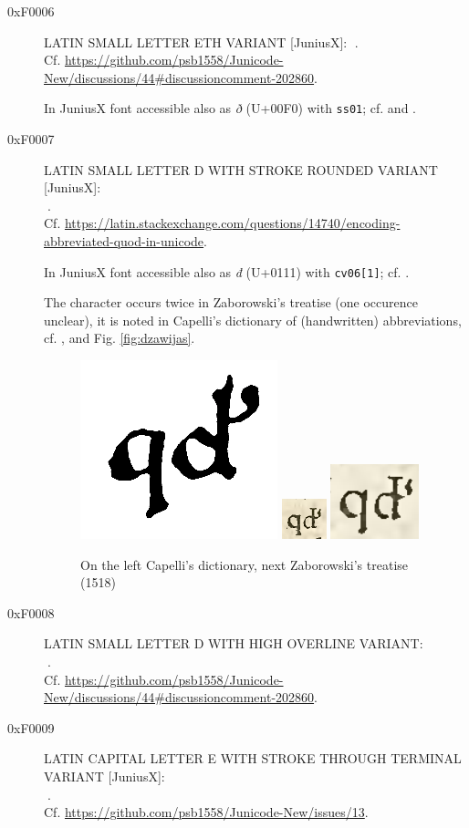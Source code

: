 \documentclass{article}
\newcommand{\Jglyph}[1]{{\relsize{2}\J#1}}
\begin{document}
\begin{description}
\item [0xF0006] LATIN SMALL LETTER ETH VARIANT [JuniusX]: 
  \Jglyph{󰀆}.\\ Cf. \url{https://github.com/psb1558/Junicode-New/discussions/44#discussioncomment-202860}.

  In JuniusX font accessible also as \textit{ð} (U+00F0) with
  \texttt{ss01};
  cf. \autocite[p. 11]{baker20:_opent_featur_junius_junius} and
  \autocite[p. 4 (30)]{kenmcd20:_junius_user_guide_first_draft}.

\item [0xF0007] LATIN SMALL LETTER D WITH STROKE ROUNDED VARIANT [JuniusX]:\\
  \Jglyph{󰀇}.\\
  Cf. \url{https://latin.stackexchange.com/questions/14740/encoding-abbreviated-quod-in-unicode}.

    In JuniusX font accessible also as \textit{đ}  (U+0111) with \texttt{cv06[1]};
  cf. \autocite[p. 7]{baker20:_opent_featur_junius_junius}.

  The character occurs twice in Zaborowski's treatise (one occurence
  unclear), it is noted in Capelli's dictionary of (handwritten)
  abbreviations, cf. \autocite{bień20:_trakt_stanis_zabor},
  \autocite[s. 307]{cappelli28:_lexic_wörter_abkür} and
  Fig. \vref{fig:dzawijas}.

  \begin{figure}
    \centering
    \includegraphics[height=06ex]{img/27a-0_Capelli307quod}
    \includegraphics[height=06ex]{img/27a-1_Zaborowski_Polona03_quod}
    \includegraphics[height=06ex]{img/27a-2_Zaborowski_Polona08_quod}
    \caption{On the left Capelli's dictionary, next Zaborowski's treatise (1518)}
    \label{fig:dzawijas}
  \end{figure}

  
\item [0xF0008] LATIN SMALL LETTER D WITH HIGH OVERLINE VARIANT:\\
  \Jglyph{󰀈}.\\ Cf. \url{https://github.com/psb1558/Junicode-New/discussions/44#discussioncomment-202860}.
\item [0xF0009] LATIN CAPITAL LETTER E WITH STROKE THROUGH TERMINAL VARIANT [JuniusX]:\\
  \Jglyph{󰀉}.\\ Cf. \url{https://github.com/psb1558/Junicode-New/issues/13}.
  

\end{description}
\end{document}
